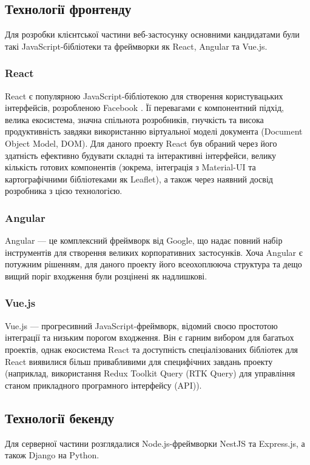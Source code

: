 \subsection{Технології фронтенду}
Для розробки клієнтської частини веб-застосунку основними кандидатами були такі JavaScript-бібліотеки та фреймворки як React, Angular та Vue.js.
\subsubsection{React}
React є популярною JavaScript-бібліотекою для створення користувацьких інтерфейсів, розробленою Facebook \cite{react}. Її перевагами є компонентний підхід, велика екосистема, значна спільнота розробників, гнучкість та висока продуктивність завдяки використанню віртуальної моделі документа (Document Object Model, DOM). Для даного проекту React був обраний через його здатність ефективно будувати складні та інтерактивні інтерфейси, велику кількість готових компонентів (зокрема, інтеграція з Material-UI та картографічними бібліотеками як Leaflet), а також через наявний досвід розробника з цією технологією.

\subsubsection{Angular}
Angular — це комплексний фреймворк від Google, що надає повний набір інструментів для створення великих корпоративних застосунків. Хоча Angular є потужним рішенням, для даного проекту його всеохоплююча структура та дещо вищий поріг входження були розцінені як надлишкові.

\subsubsection{Vue.js}
Vue.js — прогресивний JavaScript-фреймворк, відомий своєю простотою інтеграції та низьким порогом входження. Він є гарним вибором для багатьох проектів, однак екосистема React та доступність спеціалізованих бібліотек для React виявилися більш привабливими для специфічних завдань проекту (наприклад, використання Redux Toolkit Query (RTK Query) для управління станом прикладного програмного інтерфейсу (API)).

\subsection{Технології бекенду}
Для серверної частини розглядалися Node.js-фреймворки NestJS та Express.js, а також Django на Python.
